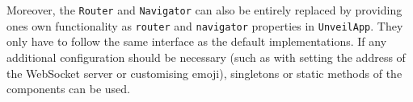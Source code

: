Moreover, the \texttt{Router} and \texttt{Navigator} can also be entirely replaced by providing ones own functionality as \texttt{router} and \texttt{navigator} properties in \texttt{UnveilApp}. They only have to follow the same interface as the default implementations. If any additional configuration should be necessary (such as with setting the address of the WebSocket server or customising emoji), singletons or static methods of the components can be used.